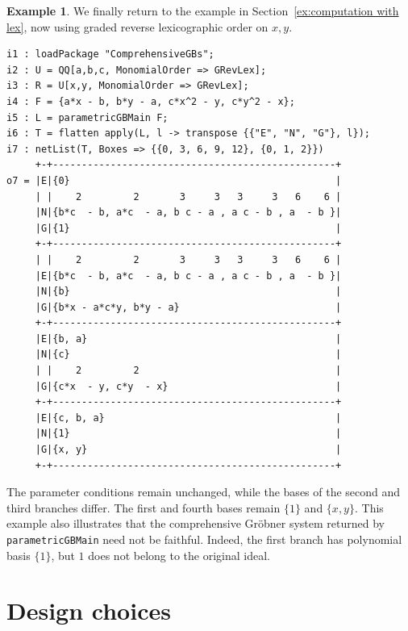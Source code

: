 \documentclass[11pt]{amsart}
\theoremstyle{plain}
\theoremstyle{definition}
\newtheorem{example}[theorem]{Example}
\theoremstyle{remark}
\begin{document}
\begin{example}
We finally return to the example in Section~\ref{ex:computation with lex}, now using graded
reverse lexicographic order on $x,y$.
\begin{lstlisting}
i1 : loadPackage "ComprehensiveGBs";
i2 : U = QQ[a,b,c, MonomialOrder => GRevLex];
i3 : R = U[x,y, MonomialOrder => GRevLex];
i4 : F = {a*x - b, b*y - a, c*x^2 - y, c*y^2 - x};
i5 : L = parametricGBMain F;
i6 : T = flatten apply(L, l -> transpose {{"E", "N", "G"}, l});
i7 : netList(T, Boxes => {{0, 3, 6, 9, 12}, {0, 1, 2}})
     +-+-------------------------------------------------+
o7 = |E|{0}                                              |
     | |    2         2       3     3   3     3   6    6 |
     |N|{b*c  - b, a*c  - a, b c - a , a c - b , a  - b }|
     |G|{1}                                              |
     +-+-------------------------------------------------+
     | |    2         2       3     3   3     3   6    6 |
     |E|{b*c  - b, a*c  - a, b c - a , a c - b , a  - b }|
     |N|{b}                                              |
     |G|{b*x - a*c*y, b*y - a}                           |
     +-+-------------------------------------------------+
     |E|{b, a}                                           |
     |N|{c}                                              |
     | |    2         2                                  |
     |G|{c*x  - y, c*y  - x}                             |
     +-+-------------------------------------------------+
     |E|{c, b, a}                                        |
     |N|{1}                                              |
     |G|{x, y}                                           |
     +-+-------------------------------------------------+
\end{lstlisting}

The parameter conditions remain unchanged, while the bases of the second and third branches differ. The first and fourth bases remain $\lbrace 1\rbrace$ and $\lbrace x,y\rbrace$. This example also illustrates that the comprehensive
Gr\"obner system returned by \texttt{parametricGBMain}
need not be faithful.
Indeed, the first branch has polynomial basis $\{1\}$,
but $1$ does not belong to the original ideal.
\end{example}

\section{Design choices}\label{section:design-choices}
\end{document}
